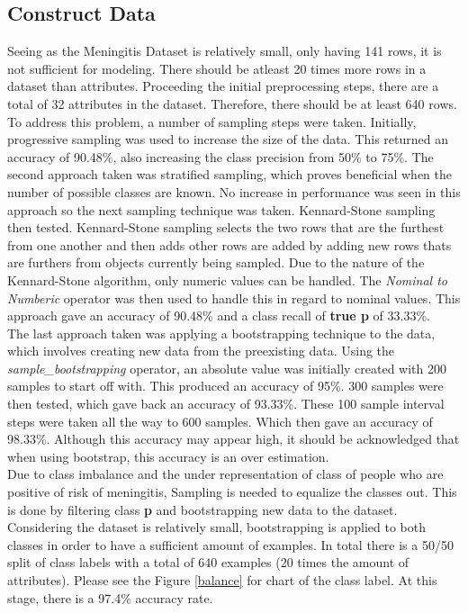 \subsection*{Construct Data}
Seeing as the Meningitis Dataset is relatively small, only having 141 rows, it is not sufficient for modeling. There should be atleast 20 times more rows in a dataset than attributes. Proceeding the initial preprocessing steps, there are a total of 32 attributes in the dataset. Therefore, there should be at least 640 rows. To address this problem, a number of sampling steps were taken. Initially, progressive sampling was used to increase the size of the data. This returned an accuracy of 90.48\%, also increasing the class precision from 50\% to 75\%. The second approach taken was stratified sampling, which proves beneficial when the number of possible classes are known. No increase in performance was seen in this approach so the next sampling technique was taken. Kennard-Stone sampling then tested. Kennard-Stone sampling selects the two rows  that are the furthest from one another and then adds other rows are added by adding new rows thats are furthers from objects currently being sampled. Due to the nature of the Kennard-Stone algorithm, only numeric values can be handled. The \textit{Nominal to Numberic} operator was then used to handle this in regard to nominal values. This approach gave an accuracy of 90.48\% and a class recall of \textbf{true p} of 33.33\%. \\
The last approach taken was applying a bootstrapping technique to the data, which involves creating new data from the preexisting data. Using the \textit{sample\_bootstrapping} operator, an absolute value was initially created with 200 samples to start off with. This produced an accuracy of 95\%. 300 samples were then tested, which gave back an accuracy of 93.33\%. These 100 sample interval steps were taken all the way to 600 samples. Which then gave an accuracy of 98.33\%. Although this accuracy may appear high, it should be acknowledged that when using bootstrap, this accuracy is an over estimation.\\
Due to class imbalance and the under representation of class of people who are positive of risk of meningitis, Sampling is needed to equalize the classes out. This is done by filtering class \textbf{p} and bootstrapping new data to the dataset. Considering the dataset is relatively small, bootstrapping is applied to both classes in order to have a sufficient amount of examples. In total there is a 50/50 split of class labels with a total of 640 examples (20 times the amount of attributes). Please see the Figure \ref{balance} for chart of the class label. At this stage, there is a 97.4\% accuracy rate.

